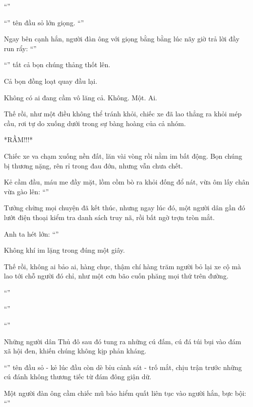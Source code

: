\documentclass[../main.tex]{subfiles}
\begin{document}
``''

``'' tên đầu sỏ lớn giọng. ``''

Ngay bên cạnh hắn, người đàn ông với giọng bằng bằng lúc nãy giờ trả lời đầy run rẩy: ``''

``'' tất cả bọn chúng thảng thốt lên.

Cả bọn đồng loạt quay đầu lại.

Không có ai đang cầm vô lăng cả. Không. Một. Ai.

Thế rồi, như một điều không thể tránh khỏi, chiếc xe đã lao thẳng ra khỏi mép cầu, rơi tự do xuống dưới trong sự bàng hoàng của cả nhóm.

*RẦM!!!*

Chiếc xe va chạm xuống nền đất, lăn vài vòng rồi nằm im bất động. Bọn chúng bị thương nặng, rên rỉ trong đau đớn, nhưng vẫn chưa chết.

Kẻ cầm đầu, máu me đầy mặt, lồm cồm bò ra khỏi đống đổ nát, vừa ôm lấy chân vừa gào lên: ``''

Tưởng chừng mọi chuyện đã kết thúc, nhưng ngay lúc đó, một người dân gần đó lướt điện thoại kiểm tra danh sách truy nã, rồi bất ngờ trợn tròn mắt.

Anh ta hét lớn: ``''

Không khí im lặng trong đúng một giây.

Thế rồi, không ai bảo ai, hàng chục, thậm chí hàng trăm người bỏ lại xe cộ mà lao tới chỗ người đó chỉ, như một cơn bão cuốn phăng mọi thứ trên đường.

``''

``''

``''

Những người dân Thủ đô sau đó tung ra những cú đấm, cú đá túi bụi vào đám xã hội đen, khiến chúng không kịp phản kháng.

``'' tên đầu sỏ - kẻ lúc đầu còn dè bỉu cảnh sát - trố mắt, chịu trận trước những cú đánh không thương tiếc từ đám đông giận dữ.

Một người đàn ông cầm chiếc mũ bảo hiểm quất liên tục vào người hắn, bực bội: ``''
\end{document}

